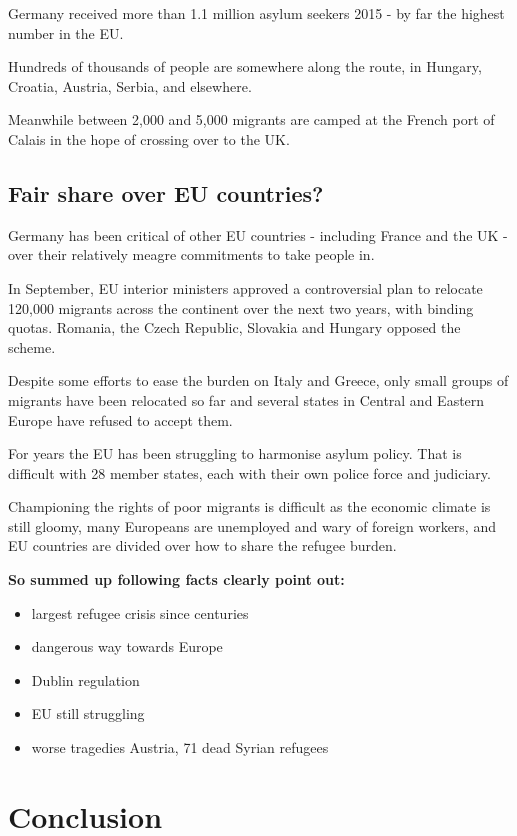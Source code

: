 Germany received more than 1.1 million asylum seekers 2015 - by far the highest number in the EU.

Hundreds of thousands of people are somewhere along the route, in Hungary, Croatia, Austria, Serbia, and elsewhere.

Meanwhile between 2,000 and 5,000 migrants are camped at the French port of Calais in the hope of crossing over to the UK.

\subsection{Fair share over EU countries?}

Germany has been critical of other EU countries - including France and the UK -over their relatively meagre commitments to take people in.

In September, EU interior ministers approved a controversial plan to relocate 120,000 migrants across the continent over the next two years, with binding quotas. Romania, the Czech Republic, Slovakia and Hungary opposed the scheme.

Despite some efforts to ease the burden on Italy and Greece, only small groups of migrants have been relocated so far and several states in Central and Eastern Europe have refused to accept them.

For years the EU has been struggling to harmonise asylum policy. That is difficult with 28 member states, each with their own police force and judiciary.

Championing the rights of poor migrants is difficult as the economic climate is still gloomy, many Europeans are unemployed and wary of foreign workers, and EU countries are divided over how to share the refugee burden.

\textbf{So summed up following facts clearly point out:}
\begin{itemize}
	\item largest refugee crisis since centuries
	\item dangerous way towards Europe
	\item Dublin regulation
	\item EU still struggling
	\item worse tragedies
		\subitem Austria, 71 dead Syrian refugees
	
\end{itemize}

\newpage
\section{Conclusion}

